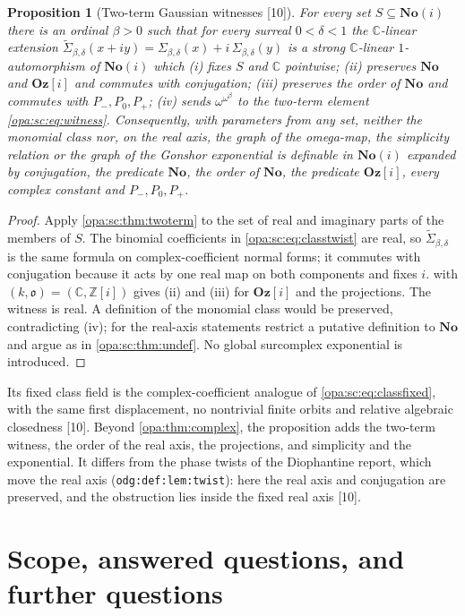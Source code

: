 \documentclass[11pt,oneside]{article}
\numberwithin{equation}{section}
\newtheorem{proposition}[proposition]{Proposition}
\theoremstyle{definition}
\theoremstyle{remark}
\newcommand{\No}{\mathbf{No}}
\newcommand{\Og}{\mathbf{Oz}[i]}
\newcommand{\SC}{\mathbf{No}(i)}
\newcommand{\C}{\mathbb C}
\newcommand{\Z}{\mathbb Z}
\newcommand{\oo}{\mathfrak o}
\newcommand{\src}[1]{\textup{\textsf{\small[#1]}}}
\newcommand{\lbl}[1]{\nolinkurl{#1}}
\begin{document}
\begin{proposition}[Two-term Gaussian witnesses \src{10}]\label{opa:sc:prop:complex}
For every set $S\subseteq\SC$ there is an ordinal $\beta>0$ such that for every
surreal $0<\delta<1$ the $\C$-linear extension
$\widetilde\Sigma_{\beta,\delta}(x+iy)=\Sigma_{\beta,\delta}(x)+i\,\Sigma_{\beta,\delta}(y)$ is a
strong $\C$-linear $1$-automorphism of $\SC$ which
\textup{(i)} fixes $S$ and $\C$ pointwise;
\textup{(ii)} preserves $\No$ and $\Og$ and commutes with conjugation;
\textup{(iii)} preserves the order of $\No$ and commutes with $P_-,P_0,P_+$;
\textup{(iv)} sends $\omega^{\omega^\beta}$ to the two-term element
\eqref{opa:sc:eq:witness}. Consequently, with parameters from any set, neither
the monomial class nor, on the real axis, the graph of the omega-map, the
simplicity relation or the graph of the Gonshor exponential is definable in
$\SC$ expanded by conjugation, the predicate $\No$, the order of $\No$, the
predicate $\Og$, every complex constant and $P_-,P_0,P_+$.
\end{proposition}
\begin{proof}
Apply \cref{opa:sc:thm:twoterm} to the set of real and imaginary parts of the
members of $S$. The binomial coefficients in \eqref{opa:sc:eq:classtwist} are
real, so $\widetilde\Sigma_{\beta,\delta}$ is the same formula on complex-coefficient
normal forms; it commutes with conjugation because it acts by one real map on
both components and fixes $i$.  with $(k,\oo)=(\C,\Z[i])$
gives (ii) and (iii) for $\Og$ and the projections. The witness is real. A
definition of the monomial class would be preserved, contradicting (iv); for
the real-axis statements restrict a putative definition to $\No$ and argue as in
\cref{opa:sc:thm:undef}. No global surcomplex exponential is introduced.
\end{proof}

Its fixed class field is the complex-coefficient analogue of
\eqref{opa:sc:eq:classfixed}, with the same first displacement, no nontrivial
finite orbits and relative algebraic closedness \src{10}. Beyond
\cref{opa:thm:complex}, the proposition adds the two-term witness, the order of
the real axis, the projections, and simplicity and the exponential. It differs
from the phase twists of the Diophantine report, which move the real axis
(\lbl{odg:def:lem:twist}): here the real axis and conjugation are preserved, and
the obstruction lies inside the fixed real axis \src{10}.

\section{Scope, answered questions, and further questions}\label{opa:sec:scope}
\end{document}
